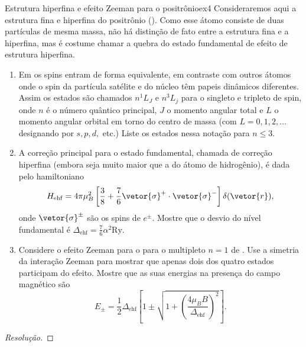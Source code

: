 \begin{exercício}{Estrutura hiperfina e efeito Zeeman para o positrônio}{ex4}
   Consideraremos aqui a estrutura fina e hiperfina do positrônio (). Como esse átomo consiste de duas partículas de mesma massa, não há distinção de fato entre a estrutura fina e a hiperfina, mas é costume chamar a quebra do estado fundamental de efeito de estrutura hiperfina.
   \begin{enumerate}[label=(\alph*)]
      \item Em  os spins entram de forma equivalente, em contraste com outros átomos onde o spin da partícula satélite e do núcleo têm papeis dinâmicos diferentes. Assim os estados  são chamados \(n^1L_J\) e \(n^3 L_j\) para o singleto e tripleto de spin, onde \(n\) é o número quântico principal, \(J\) o momento angular total e \(L\) o momento angular orbital em torno do centro de massa (com \(L = 0, 1, 2, \dots\) designando por \(s,p,d,\) etc.) Liste os estados nessa notação para \(n \leq 3.\)
      \item A correção principal para o estado fundamental, chamada de correção hiperfina (embora seja muito maior que a do átomo de hidrogênio), é dada pelo hamiltoniano
         \begin{equation*}
            H_\mathrm{ehf} = 4\pi \mu_B^2 \left[\frac38 + \frac76 \vetor{\sigma}^+ \cdot \vetor{\sigma}^-\right]\delta(\vetor{r}),
         \end{equation*}
         onde \(\vetor{\sigma}^{\pm}\) são os spins de \(e^{\pm}.\) Mostre que o desvio do nível fundamental é \(\Delta_{\mathrm{ehf}} = \frac76 \alpha^2 \mathrm{Ry}.\)
      \item Considere o efeito Zeeman para o para o multipleto \(n = 1\) de . Use a simetria da interação Zeeman para mostrar que apenas dois dos quatro estados participam do efeito. Mostre que as suas energias na presença do campo magnético são
         \begin{equation*}
         E_\pm = \frac12 \Delta_\mathrm{ehf} \left[1 \pm \sqrt{1 + \left(\frac{4 \mu_B B}{\Delta_\mathrm{ehf}}\right)^2}\right].
         \end{equation*}
   \end{enumerate}
\end{exercício}
\begin{proof}[Resolução]
    
\end{proof}
